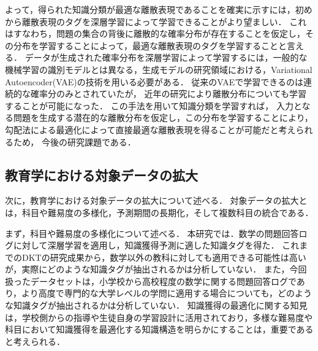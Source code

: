 よって，得られた知識分類が最適な離散表現であることを確実に示すには，初めから離散表現のタグを深層学習によって学習できることがより望ましい．
これはすなわち，問題の集合の背後に離散的な確率分布が存在することを仮定し，その分布を学習することによって，最適な離散表現のタグを学習することと言える．
データが生成された確率分布を深層学習によって学習するには，一般的な機械学習の識別モデルとは異なる，生成モデルの研究領域における，Variational Autoencoder(VAE)の技術を用いる必要がある\cite{kingma2014semi}．
従来のVAEで学習できるのは連続的な確率分のみとされていたが，
近年の研究により離散分布についても学習することが可能になった\cite{maddison2016concrete, jang2016categorical}．
この手法を用いて知識分類を学習すれば，
入力となる問題を生成する潜在的な離散分布を仮定し，この分布を学習することにより，
勾配法による最適化によって直接最適な離散表現を得ることが可能だと考えられるため，
今後の研究課題である．




\subsection{教育学における対象データの拡大}
次に，教育学における対象データの拡大について述べる．
対象データの拡大とは，科目や難易度の多様化，予測期間の長期化，そして複数科目の統合である．


まず，科目や難易度の多様化について述べる．
本研究では．数学の問題回答ログに対して深層学習を適用し，知識獲得予測に適した知識タグを得た．
これまでのDKTの研究成果から，数学以外の教科に対しても適用できる可能性は高いが，実際にどのような知識タグが抽出されるかは分析していない．
また，今回扱ったデータセットは，小学校から高校程度の数学に関する問題回答ログであり，より高度で専門的な大学レベルの学問に適用する場合についても，どのような知識タグが抽出されるかは分析していない．
知識獲得の最適化に関する知見は，学校側からの指導や生徒自身の学習設計に活用されており，多様な難易度や科目において知識獲得を最適化する知識構造を明らかにすることは，重要であると考えられる．


